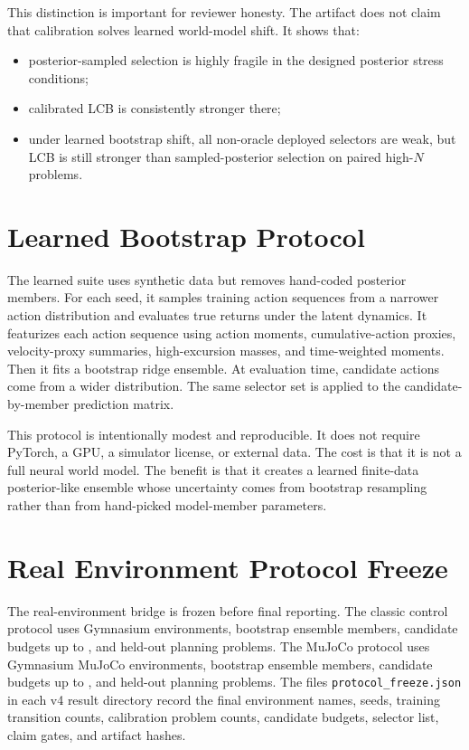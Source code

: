 \documentclass{article}
\begin{document}
This distinction is important for reviewer honesty. The artifact does not
claim that calibration solves learned world-model shift. It shows that:
\begin{itemize}
    \item posterior-sampled selection is highly fragile in the designed
    posterior stress conditions;
    \item calibrated LCB is consistently stronger there;
    \item under learned bootstrap shift, all non-oracle deployed selectors are
    weak, but LCB is still stronger than sampled-posterior selection on paired
    high-$N$ problems.
\end{itemize}

\section{Learned Bootstrap Protocol}

The learned suite uses synthetic data but removes hand-coded posterior members.
For each seed, it samples training action sequences from a narrower action
distribution and evaluates true returns under the latent dynamics. It featurizes
each action sequence using action moments, cumulative-action proxies,
velocity-proxy summaries, high-excursion masses, and time-weighted moments.
Then it fits a bootstrap ridge ensemble. At evaluation time, candidate actions
come from a wider distribution. The same selector set is applied to the
candidate-by-member prediction matrix.

This protocol is intentionally modest and reproducible. It does not require
PyTorch, a GPU, a simulator license, or external data. The cost is that it is
not a full neural world model. The benefit is that it creates a learned
finite-data posterior-like ensemble whose uncertainty comes from bootstrap
resampling rather than from hand-picked model-member parameters.

\section{Real Environment Protocol Freeze}

The real-environment bridge is frozen before final reporting. The classic
control protocol uses \VFourGymEnvironments{} Gymnasium environments,
\VFourGymEnsembleSize{} bootstrap ensemble members, candidate budgets up to
\VFourGymHighN{}, and \VFourGymProblems{} held-out planning problems. The
MuJoCo protocol uses \VFourMujocoEnvironments{} Gymnasium MuJoCo environments,
\VFourMujocoEnsembleSize{} bootstrap ensemble members, candidate budgets up to
\VFourMujocoHighN{}, and \VFourMujocoProblems{} held-out planning problems.
The files \texttt{protocol\_freeze.json} in each v4 result directory record
the final environment names, seeds, training transition counts, calibration
problem counts, candidate budgets, selector list, claim gates, and artifact
hashes.
\end{document}
